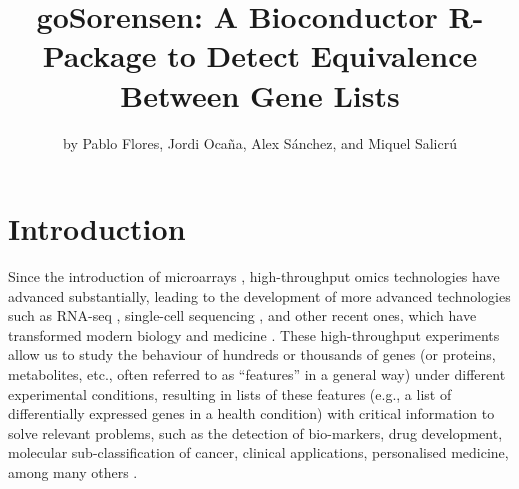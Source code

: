 \title{goSorensen: A Bioconductor R-Package to Detect Equivalence Between Gene Lists}


\author{by Pablo Flores, Jordi Ocaña, Alex Sánchez, and Miquel Salicrú}

\maketitle


\hypertarget{introduction}{%
\section{Introduction}\label{introduction}}

Since the introduction of microarrays \citep{schena1995quantitative, nguyen2002dna}, high-throughput omics technologies have advanced substantially, leading to the development of more advanced technologies such as RNA-seq \citep{chu2012rna, van2019rna}, single-cell sequencing \citep{jovic2022single}, and other recent ones, which have transformed modern biology and medicine \citep{lee2023principles, negi2022applications}.
These high-throughput experiments allow us to study the behaviour of hundreds or thousands of genes (or proteins, metabolites, etc., often referred to as ``features'' in a general way) under different experimental conditions, resulting in lists of these features (e.g., a list of differentially expressed genes in a health condition) with critical information to solve relevant problems, such as the detection of bio-markers, drug development, molecular sub-classification of cancer, clinical applications, personalised medicine, among many others \citep{climente2017functional, cieslik2018cancer, pedersen2016clinical, jain2004applications}.

